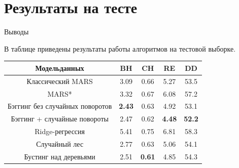 \documentclass[10pt,pdf,hyperref={unicode}]{beamer}
\begin{document}
\section{Результаты на тесте}
\begin{frame}{Выводы}

В таблице приведены результаты работы алгоритмов на тестовой выборке.
\begin{table}[h!]
\begin{center}
\begin{tabular}{|c|c|c|c|c|}
\hline
Модель данных & BH & CH & RE & DD\\
    \hline
    Классический MARS  & 3.09 &  0.66 &  5.27 &  53.5\\
    \hline
    MARS* & 3.32 &  0.67 &  6.08 &  57.2\\
    \hline
    Бэггинг без случайных поворотов  & \textbf{2.43} & 0.63 &  4.92 &  53.1\\
    \hline
    Бэггинг + 
    случайные повороты & 2.47 & 0.62 &  \textbf{4.48} &  \textbf{52.2}\\
    \hline
    Ridge-регрессия  & 5.41 &  0.75 &  6.81 &  58.3\\
    \hline
    Случайный лес  & 2.77 & 0.63 & 5.06 &  54.1\\
    \hline
    Бустинг над 
    деревьями & 2.51 &  \textbf{0.61} &  4.85 &  54.3\\
    \hline
\end{tabular}
\end{center}
\end{table}
\end{frame}
\end{document}
